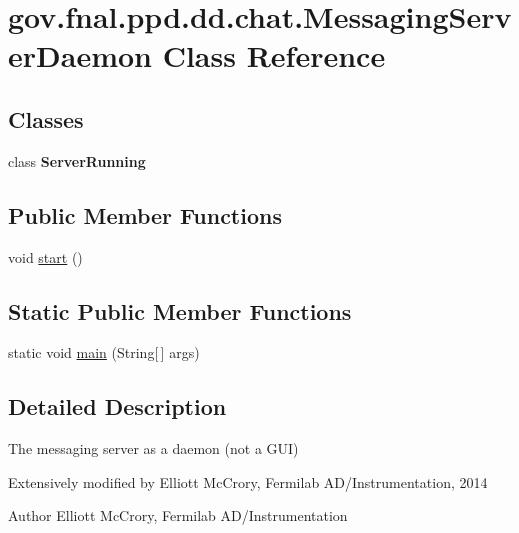 \hypertarget{classgov_1_1fnal_1_1ppd_1_1dd_1_1chat_1_1MessagingServerDaemon}{\section{gov.\-fnal.\-ppd.\-dd.\-chat.\-Messaging\-Server\-Daemon Class Reference}
\label{classgov_1_1fnal_1_1ppd_1_1dd_1_1chat_1_1MessagingServerDaemon}
}
\subsection*{Classes}
\begin{DoxyCompactItemize}
\item 
class {\bfseries Server\-Running}
\end{DoxyCompactItemize}
\subsection*{Public Member Functions}
\begin{DoxyCompactItemize}
\item 
void \hyperlink{classgov_1_1fnal_1_1ppd_1_1dd_1_1chat_1_1MessagingServerDaemon_a00cbd9c8eec08febc8d4c8baba8bf5fd}{start} ()
\end{DoxyCompactItemize}
\subsection*{Static Public Member Functions}
\begin{DoxyCompactItemize}
\item 
static void \hyperlink{classgov_1_1fnal_1_1ppd_1_1dd_1_1chat_1_1MessagingServerDaemon_a00c5f81d7957dbba0fe6ef52b10d21f0}{main} (String\mbox{[}$\,$\mbox{]} args)
\end{DoxyCompactItemize}


\subsection{Detailed Description}
The messaging server as a daemon (not a G\-U\-I) 

Extensively modified by Elliott Mc\-Crory, Fermilab A\-D/\-Instrumentation, 2014 

\begin{DoxyAuthor}{Author}
Elliott Mc\-Crory, Fermilab A\-D/\-Instrumentation 
\end{DoxyAuthor}



